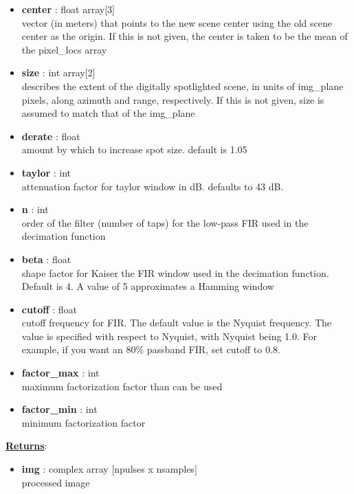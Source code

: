 \documentclass{article}
\newcommand{\defs}[2]{\textbf{{#1}} : {#2}}
\begin{document}
\begin{itemize}
\begin{itemize}
	\end{itemize}
	\item\defs{center}{float array[3]}\\
	vector (in meters) that points to the new scene center using the old scene center as the origin.  If this is not given, the center is taken to be the mean of the pixel\_locs array
	\item\defs{size}{int array[2]}\\
	describes the extent of the digitally spotlighted scene, in units of img\_plane pixels, along azimuth and range, respectively.  If this is not given, size is assumed to match that of the img\_plane
	\item\defs{derate}{float}\\
	amount by which to increase spot size. default is 1.05
	\item\defs{taylor}{int}\\
	attenuation factor for taylor window in dB.  defaults to 43 dB.
	\item\defs{n}{int}\\
	order of the filter (number of taps) for the low-pass FIR used in the decimation function
	\item\defs{beta}{float}\\
	shape factor for Kaiser the FIR window used in the decimation function.  Default is 4. A value of 5 approximates a Hamming window \cite{scipy_kaiser}
	\item\defs{cutoff}{float}\\
	cutoff frequency for FIR.  The default value is the Nyquist frequency.  The value is specified with respect to Nyquist, with Nyquist being 1.0.  For example, if you want an 80\% passband FIR, set cutoff to 0.8.
	\item\defs{factor\_max}{int}\\
	maximum factorization factor than can be used
	\item\defs{factor\_min}{int}\\
	minimum factorization factor
\end{itemize}

\noindent \underline{\textbf{Returns}}:
\begin{itemize}
	\item \defs{img}{complex array [npulses x nsamples]}\\
	processed image
\end{itemize}
\end{document}
